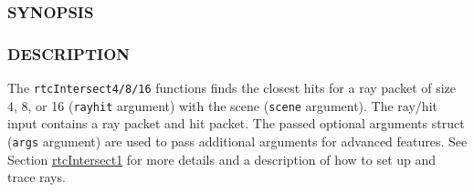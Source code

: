 \subsubsection{SYNOPSIS}\label{synopsis}

\begin{Shaded}
\begin{Highlighting}[]

\OperatorTok{(}
   \OperatorTok{*}\OperatorTok{,}
\OperatorTok{,}
  \OperatorTok{*}\OperatorTok{,}
  \OperatorTok{*}\OperatorTok{=}
\OperatorTok{);}

\OperatorTok{(}
   \OperatorTok{*}\OperatorTok{,}
\OperatorTok{,}
  \OperatorTok{*}\OperatorTok{,}
  \OperatorTok{*}\OperatorTok{=}
\OperatorTok{);}

\OperatorTok{(}
   \OperatorTok{*}\OperatorTok{,}
\OperatorTok{,}
  \OperatorTok{*}\OperatorTok{,}
  \OperatorTok{*}\OperatorTok{=}
\OperatorTok{);}
\end{Highlighting}
\end{Shaded}

\subsubsection{DESCRIPTION}\label{description}

The \texttt{rtcIntersect4/8/16} functions finds the closest hits for a
ray packet of size 4, 8, or 16 (\texttt{rayhit} argument) with the scene
(\texttt{scene} argument). The ray/hit input contains a ray packet and
hit packet. The passed optional arguments struct (\texttt{args}
argument) are used to pass additional arguments for advanced features.
See Section \hyperref[rtcintersect1]{rtcIntersect1} for more details and
a description of how to set up and trace rays.

